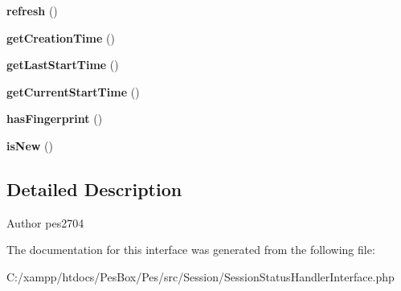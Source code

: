 \begin{DoxyCompactItemize}
{\bfseries refresh} ()
\item 
\mbox{\label{interface_pes_1_1_session_1_1_session_status_handler_interface_a8af92ba90a86c8c4abaf02cc314440f1}} 
{\bfseries get\+Creation\+Time} ()
\item 
\mbox{\label{interface_pes_1_1_session_1_1_session_status_handler_interface_a0a413f841ff7f4681218eebe9acc847f}} 
{\bfseries get\+Last\+Start\+Time} ()
\item 
\mbox{\label{interface_pes_1_1_session_1_1_session_status_handler_interface_a2ac1590473377275979c720110f5cfed}} 
{\bfseries get\+Current\+Start\+Time} ()
\item 
\mbox{\label{interface_pes_1_1_session_1_1_session_status_handler_interface_aa053bd6719cc91c4fa951aa9266748aa}} 
{\bfseries has\+Fingerprint} ()
\item 
\mbox{\label{interface_pes_1_1_session_1_1_session_status_handler_interface_ad5305cbf1b1f253e8bef4b2c478dacb0}} 
{\bfseries is\+New} ()
\end{DoxyCompactItemize}


\subsection{Detailed Description}
\begin{DoxyAuthor}{Author}
pes2704 
\end{DoxyAuthor}


The documentation for this interface was generated from the following file\+:\begin{DoxyCompactItemize}
\item 
C\+:/xampp/htdocs/\+Pes\+Box/\+Pes/src/\+Session/Session\+Status\+Handler\+Interface.\+php\end{DoxyCompactItemize}
